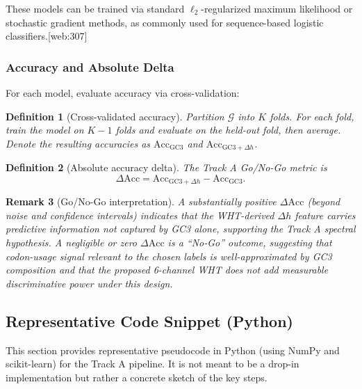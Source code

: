 \documentclass[11pt]{article}
\newtheorem{definition}{Definition}[section]
\newtheorem{remark}[definition]{Remark}
\begin{document}
These models can be trained via standard \(\ell_2\)-regularized maximum likelihood or stochastic gradient methods, as commonly used for sequence-based logistic classifiers.[web:307]

\subsubsection{Accuracy and Absolute Delta}

For each model, evaluate accuracy via cross-validation:

\begin{definition}[Cross-validated accuracy]
Partition \(\mathcal{G}\) into \(K\) folds.
For each fold, train the model on \(K-1\) folds and evaluate on the held-out fold, then average.
Denote the resulting accuracies as \(\mathrm{Acc}_{\mathrm{GC3}}\) and \(\mathrm{Acc}_{\mathrm{GC3}+\Delta h}\).
\end{definition}

\begin{definition}[Absolute accuracy delta]
The Track A Go/No-Go metric is
\[
  \Delta \mathrm{Acc} = \mathrm{Acc}_{\mathrm{GC3}+\Delta h} - \mathrm{Acc}_{\mathrm{GC3}}.
\]
\end{definition}

\begin{remark}[Go/No-Go interpretation]
A substantially positive \(\Delta \mathrm{Acc}\) (beyond noise and confidence intervals) indicates that the WHT-derived \(\Delta h\) feature carries predictive information not captured by GC3 alone, supporting the Track A spectral hypothesis.
A negligible or zero \(\Delta \mathrm{Acc}\) is a ``No-Go'' outcome, suggesting that codon-usage signal relevant to the chosen labels is well-approximated by GC3 composition and that the proposed 6-channel WHT does not add measurable discriminative power under this design.
\end{remark}

\subsection{Representative Code Snippet (Python)}

This section provides representative pseudocode in Python (using NumPy and scikit-learn) for the Track A pipeline.
It is not meant to be a drop-in implementation but rather a concrete sketch of the key steps.
\end{document}
